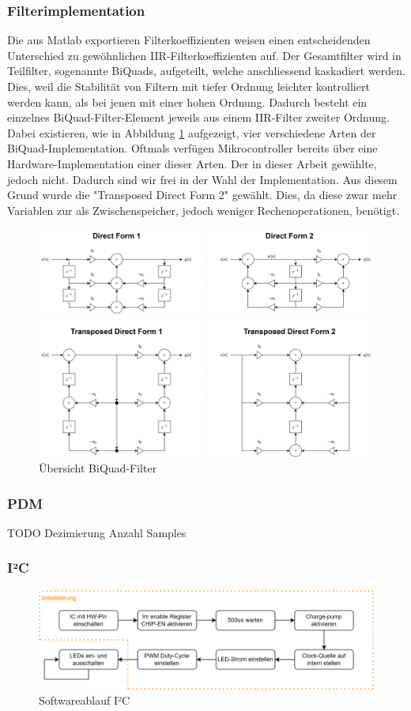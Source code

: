 \documentclass[12pt]{article}
\begin{document}
	\subsubsection*{Filterimplementation}
	Die aus Matlab exportieren Filterkoeffizienten weisen einen entscheidenden Unterschied zu gewöhnlichen IIR-Filterkoeffizienten auf. Der Gesamtfilter wird in Teilfilter, sogenannte BiQuads, aufgeteilt, welche anschliessend kaskadiert werden. Dies, weil die Stabilität von Filtern mit tiefer Ordnung leichter kontrolliert werden kann, als bei jenen mit einer hohen Ordnung. Dadurch besteht ein einzelnes BiQuad-Filter-Element jeweils aus einem IIR-Filter zweiter Ordnung. Dabei existieren, wie in Abbildung \ref{fig:batbiquad-uebersicht} aufgezeigt, vier verschiedene Arten der BiQuad-Implementation. Oftmals verfügen Mikrocontroller bereits über eine Hardware-Implementation einer dieser Arten. Der in dieser Arbeit gewählte, jedoch nicht. Dadurch sind wir frei in der Wahl der Implementation. Aus diesem Grund wurde die "Transposed Direct Form 2" gewählt. Dies, da diese zwar mehr Variablen zur als Zwischenspeicher, jedoch weniger Rechenoperationen, benötigt.
	\begin{figure}[H]
		\centering
		\includegraphics[width=1\linewidth]{images/BAT_BiQuad-Uebersicht}
		\caption{Übersicht BiQuad-Filter}
		\label{fig:batbiquad-uebersicht}
	\end{figure}
	\subsubsection*{PDM}
	\color{red}TODO\color{black}
	Dezimierung
	Anzahl Samples
	\subsubsection*{I²C}
	\begin{figure}[H]
		\centering
		\includegraphics[width=1\linewidth]{images/BAT_Flussdiagramm_I2C_V2}
		\caption{Softwareablauf I²C}
		\label{fig:batflussdiagrammi2cv2}
	\end{figure}
\end{document}

